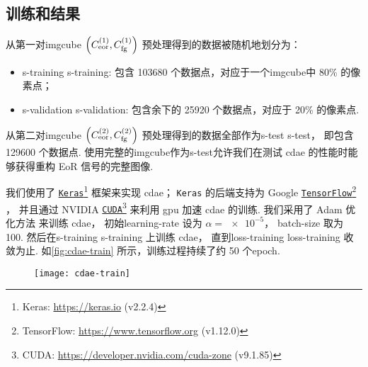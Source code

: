 \subsection{训练和结果}
\label{sec:cdae-results}

从第一对\ac{imgcube}
$\left( C_{\mathrm{eor}}^{(1)}, C_{\mathrm{fg}}^{(1)} \right)$
预处理得到的数据被随机地划分为：
\begin{itemize}
  \item \acl{s-training} \ac{s-training}:
    包含 \num{103680} 个数据点，对应于一个\ac{imgcube}中 80\% 的像素点；
  \item \acl{s-validation} \ac{s-validation}:
    包含余下的 \num{25920} 个数据点，对应于 20\% 的像素点.
\end{itemize}
从第二对\ac{imgcube}
$\left( C_{\mathrm{eor}}^{(2)}, C_{\mathrm{fg}}^{(2)} \right)$
预处理得到的数据全部作为\acl{s-test} \ac{s-test}，
即包含 \num{129600} 个数据点.
使用完整的\ac{imgcube}作为\acl{s-test}允许我们在测试 \ac{cdae}
的性能时能够获得重构 EoR 信号的完整图像.

我们使用了 \href{https://keras.io}{\texttt{Keras}}\footnote{%
  Keras: \url{https://keras.io} (v2.2.4)}
框架\cite{keras}来实现 \ac{cdae}；
\texttt{Keras} 的后端支持为 Google
\href{https://www.tensorflow.org}{\texttt{TensorFlow}}\footnote{%
  TensorFlow: \url{https://www.tensorflow.org} (v1.12.0)}
\cite{tensorflow}，
并且通过 NVIDIA
\href{https://developer.nvidia.com/cuda-zone}{\texttt{CUDA}}\footnote{%
  CUDA: \url{https://developer.nvidia.com/cuda-zone} (v9.1.85)}
来利用 \ac{gpu} 加速 \ac{cdae} 的训练.
我们采用了 Adam 优化方法\cite{kingma2015} 来训练 \ac{cdae}，
初始\ac{learning-rate} 设为 $\alpha = \num{e-5}$，
\ac{batch-size} 取为 100.
然后在\acl{s-training} \ac{s-training} 上训练 \ac{cdae}，
直到\acl{loss-training} \ac{loss-training} 收敛为止.
如\autoref{fig:cdae-train} 所示，训练过程持续了约 50 个\ac{epoch}.

\begin{figure}[htp]
  \centering
  \texttt{[image: cdae-train]}
  \label{fig:cdae-train}
\end{figure}

